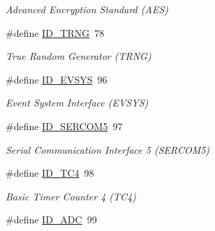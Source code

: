 \begin{DoxyCompactItemize}
\begin{DoxyCompactList}\small\item\em Advanced Encryption Standard (A\+E\+S) \end{DoxyCompactList}\item 
\hypertarget{group___s_a_m_l21_j18_a__id_ga32e3a2d1d01b609629bf9a7637376ead}{}\#define \hyperlink{group___s_a_m_l21_j18_a__id_ga32e3a2d1d01b609629bf9a7637376ead}{I\+D\+\_\+\+T\+R\+N\+G}~78\label{group___s_a_m_l21_j18_a__id_ga32e3a2d1d01b609629bf9a7637376ead}

\begin{DoxyCompactList}\small\item\em True Random Generator (T\+R\+N\+G) \end{DoxyCompactList}\item 
\hypertarget{group___s_a_m_l21_j18_a__id_ga0a016b559f7cf0ec4f625ab9b8219720}{}\#define \hyperlink{group___s_a_m_l21_j18_a__id_ga0a016b559f7cf0ec4f625ab9b8219720}{I\+D\+\_\+\+E\+V\+S\+Y\+S}~96\label{group___s_a_m_l21_j18_a__id_ga0a016b559f7cf0ec4f625ab9b8219720}

\begin{DoxyCompactList}\small\item\em Event System Interface (E\+V\+S\+Y\+S) \end{DoxyCompactList}\item 
\hypertarget{group___s_a_m_l21_j18_a__id_ga79c5ce89f89d004cb9987e28937cfdfb}{}\#define \hyperlink{group___s_a_m_l21_j18_a__id_ga79c5ce89f89d004cb9987e28937cfdfb}{I\+D\+\_\+\+S\+E\+R\+C\+O\+M5}~97\label{group___s_a_m_l21_j18_a__id_ga79c5ce89f89d004cb9987e28937cfdfb}

\begin{DoxyCompactList}\small\item\em Serial Communication Interface 5 (S\+E\+R\+C\+O\+M5) \end{DoxyCompactList}\item 
\hypertarget{group___s_a_m_l21_j18_a__id_ga59ecaec462139ce30c8ebe1dc25f9f7d}{}\#define \hyperlink{group___s_a_m_l21_j18_a__id_ga59ecaec462139ce30c8ebe1dc25f9f7d}{I\+D\+\_\+\+T\+C4}~98\label{group___s_a_m_l21_j18_a__id_ga59ecaec462139ce30c8ebe1dc25f9f7d}

\begin{DoxyCompactList}\small\item\em Basic Timer Counter 4 (T\+C4) \end{DoxyCompactList}\item 
\hypertarget{group___s_a_m_l21_j18_a__id_gafb7efa537d1d64419483b97f642009fd}{}\#define \hyperlink{group___s_a_m_l21_j18_a__id_gafb7efa537d1d64419483b97f642009fd}{I\+D\+\_\+\+A\+D\+C}~99\label{group___s_a_m_l21_j18_a__id_gafb7efa537d1d64419483b97f642009fd}


\end{DoxyCompactItemize}
